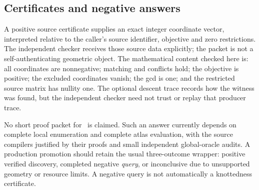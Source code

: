 \subsection{Certificates and negative answers}
A positive source certificate supplies an exact integer coordinate vector, interpreted relative to the caller's source identifier, objective and zero restrictions. The independent checker receives those source data explicitly; the packet is not a self-authenticating geometric object. The mathematical content checked here is: all coordinates are nonnegative; matching and conflicts hold; the objective is positive; the excluded coordinates vanish; the gcd is one; and the restricted source matrix has nullity one. The optional descent trace records how the witness was found, but the independent checker need not trust or replay that producer trace.

No short proof packet for \nonpos\ is claimed. Such an answer currently depends on complete local enumeration and complete atlas evaluation, with the source compilers justified by their proofs and small independent global-oracle audits. A production promotion should retain the usual three-outcome wrapper: positive verified discovery, completed negative \emph{query}, or inconclusive due to unsupported geometry or resource limits. A negative query is not automatically a knottedness certificate.
